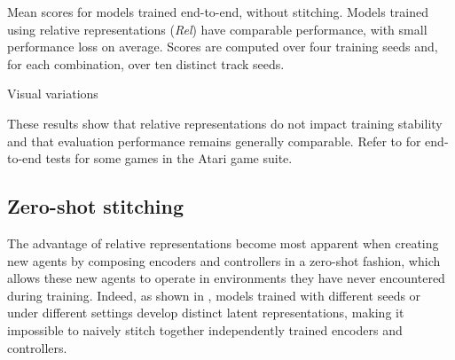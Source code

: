 \begin{table}[t!]
\caption{Mean scores for models trained end-to-end, without stitching. Models trained using relative representations (\textit{Rel}) have comparable performance, with small performance loss on average. Scores are computed over four training seeds and, for each combination, over ten distinct track seeds.}
\label{tab:relative-carracing-no_stitching}
\centering
\begin{subtable}{0.48\textwidth}
    \caption{Visual variations}
    \label{tab:relative-carracing-task}
\end{subtable}
\hfill
\begin{subtable}{0.48\textwidth}
    \caption{Task variations}
    \label{tab:relative-carracing-task}
\end{subtable}
\end{table}



These results show that relative representations do not impact training stability and that evaluation performance remains generally comparable. Refer to  for end-to-end tests for some games in the Atari game suite.

\subsection{Zero-shot stitching}\label{sec:zero-shot-stitching}
The advantage of relative representations become most apparent when creating new agents by composing encoders and controllers in a zero-shot fashion, which allows these new agents to operate in environments they have never encountered during training. Indeed, as shown in , models trained with different seeds or under different settings develop distinct latent representations, making it impossible to naively stitch together independently trained encoders and controllers.


